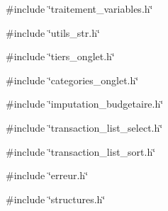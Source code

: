 {\ttfamily \#include \char`\"{}traitement\_\-variables.h\char`\"{}}\par
{\ttfamily \#include \char`\"{}utils\_\-str.h\char`\"{}}\par
{\ttfamily \#include \char`\"{}tiers\_\-onglet.h\char`\"{}}\par
{\ttfamily \#include \char`\"{}categories\_\-onglet.h\char`\"{}}\par
{\ttfamily \#include \char`\"{}imputation\_\-budgetaire.h\char`\"{}}\par
{\ttfamily \#include \char`\"{}transaction\_\-list\_\-select.h\char`\"{}}\par
{\ttfamily \#include \char`\"{}transaction\_\-list\_\-sort.h\char`\"{}}\par
{\ttfamily \#include \char`\"{}erreur.h\char`\"{}}\par
{\ttfamily \#include \char`\"{}structures.h\char`\"{}}\par
